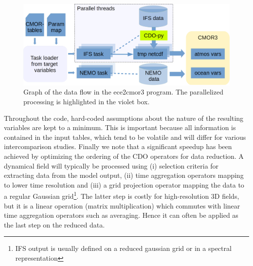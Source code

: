 \documentclass[procedia]{easychair}
\begin{document}
\begin{figure}[ht]
 \centering
 \includegraphics[width=\textwidth,clip]{ece2cmor3flowv3.png}
 \caption{Graph of the data flow in the ece2cmor3 program. The parallelized 
processing is highlighted in the violet box.}
\end{figure}

Throughout the code, hard-coded assumptions about the nature of the resulting 
variables are kept to a minimum. This is important because all information is 
contained in the input tables, which tend to be volatile and will differ for 
various intercomparison studies. Finally we note that a significant speedup has 
been achieved by optimizing the ordering of the CDO operators for data 
reduction. A dynamical field will typically be processed using (i) selection 
criteria for extracting data from the model output, (ii) time aggregation 
operators mapping to lower time resolution and (iii) a grid projection operator 
mapping the data to a regular Gaussian grid\footnote{IFS output is usually 
defined on a reduced gaussian grid or in a spectral representation}. The latter 
step is costly for high-resolution 3D fields, but it is a linear operation 
(matrix multiplication) which commutes with linear time aggregation operators 
such as averaging. Hence it can often be applied as the last step on the 
reduced data.
\end{document}
